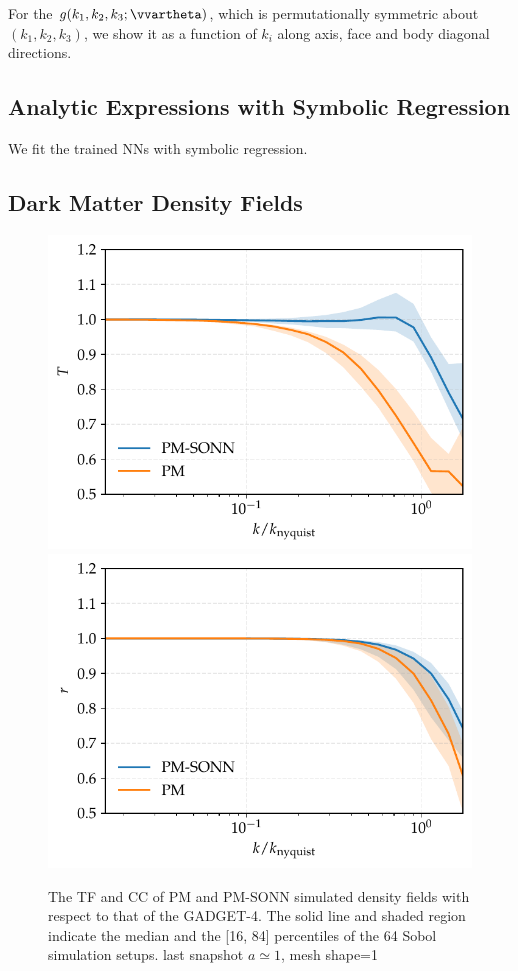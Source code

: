 \documentclass[modern, trackchanges, dvipsnames]{aastex631}
\newcommand{\GADGET}{{{\fontsize{10pt}{12pt}\selectfont GADGET}-4}}
\begin{document}
For the $g(k_1,k_2,k_3;\vvartheta)$, which is permutationally
symmetric about $(k_1, k_2, k_3)$, we show it as a function of $k_i$
along axis, face and body diagonal directions.


\subsection{Analytic Expressions with Symbolic Regression}

We fit the trained NNs with symbolic regression.


\subsection{Dark Matter Density Fields}

\begin{figure}
  \centering
  \includegraphics[width=.48\columnwidth]{tf_snap120_3091776_e3000.pdf}
  \includegraphics[width=.48\columnwidth]{cc_snap120_3091776_e3000.pdf}
  \caption{The TF and CC of PM and PM-SONN simulated density fields with
  respect to that of the \GADGET. The solid line and shaded region
  indicate the median and the [16, 84] percentiles of the 64 Sobol
  simulation setups. last snapshot $a\simeq 1$, mesh shape=1}
  \label{fig:tfcc}
\end{figure}
\end{document}
